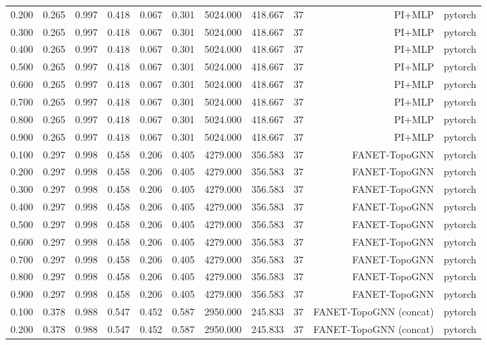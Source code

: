 \begin{tabular}{lrrrrrrrrrr}
0.200 & 0.265 & 0.997 & 0.418 & 0.067 & 0.301 & 5024.000 & 418.667 & 37 & PI+MLP & pytorch \\
0.300 & 0.265 & 0.997 & 0.418 & 0.067 & 0.301 & 5024.000 & 418.667 & 37 & PI+MLP & pytorch \\
0.400 & 0.265 & 0.997 & 0.418 & 0.067 & 0.301 & 5024.000 & 418.667 & 37 & PI+MLP & pytorch \\
0.500 & 0.265 & 0.997 & 0.418 & 0.067 & 0.301 & 5024.000 & 418.667 & 37 & PI+MLP & pytorch \\
0.600 & 0.265 & 0.997 & 0.418 & 0.067 & 0.301 & 5024.000 & 418.667 & 37 & PI+MLP & pytorch \\
0.700 & 0.265 & 0.997 & 0.418 & 0.067 & 0.301 & 5024.000 & 418.667 & 37 & PI+MLP & pytorch \\
0.800 & 0.265 & 0.997 & 0.418 & 0.067 & 0.301 & 5024.000 & 418.667 & 37 & PI+MLP & pytorch \\
0.900 & 0.265 & 0.997 & 0.418 & 0.067 & 0.301 & 5024.000 & 418.667 & 37 & PI+MLP & pytorch \\
0.100 & 0.297 & 0.998 & 0.458 & 0.206 & 0.405 & 4279.000 & 356.583 & 37 & FANET-TopoGNN & pytorch \\
0.200 & 0.297 & 0.998 & 0.458 & 0.206 & 0.405 & 4279.000 & 356.583 & 37 & FANET-TopoGNN & pytorch \\
0.300 & 0.297 & 0.998 & 0.458 & 0.206 & 0.405 & 4279.000 & 356.583 & 37 & FANET-TopoGNN & pytorch \\
0.400 & 0.297 & 0.998 & 0.458 & 0.206 & 0.405 & 4279.000 & 356.583 & 37 & FANET-TopoGNN & pytorch \\
0.500 & 0.297 & 0.998 & 0.458 & 0.206 & 0.405 & 4279.000 & 356.583 & 37 & FANET-TopoGNN & pytorch \\
0.600 & 0.297 & 0.998 & 0.458 & 0.206 & 0.405 & 4279.000 & 356.583 & 37 & FANET-TopoGNN & pytorch \\
0.700 & 0.297 & 0.998 & 0.458 & 0.206 & 0.405 & 4279.000 & 356.583 & 37 & FANET-TopoGNN & pytorch \\
0.800 & 0.297 & 0.998 & 0.458 & 0.206 & 0.405 & 4279.000 & 356.583 & 37 & FANET-TopoGNN & pytorch \\
0.900 & 0.297 & 0.998 & 0.458 & 0.206 & 0.405 & 4279.000 & 356.583 & 37 & FANET-TopoGNN & pytorch \\
0.100 & 0.378 & 0.988 & 0.547 & 0.452 & 0.587 & 2950.000 & 245.833 & 37 & FANET-TopoGNN (concat) & pytorch \\
0.200 & 0.378 & 0.988 & 0.547 & 0.452 & 0.587 & 2950.000 & 245.833 & 37 & FANET-TopoGNN (concat) & pytorch \\

\end{tabular}
